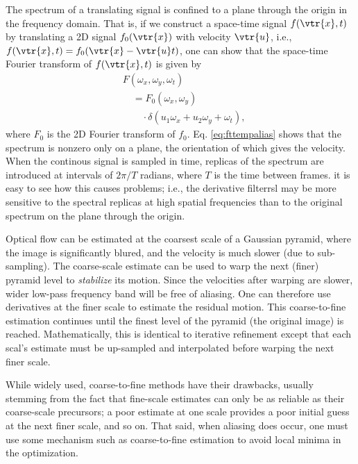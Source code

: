 \begin{compactdesc}
The spectrum of a translating signal is confined to a plane through the origin in the frequency domain. That is, if we construct a space-time signal $f(\vtr{x},t)$ by translating a 2D signal $f_0(\vtr{x})$ with  velocity $\vtr{u}$, i.e., $f(\vtr{x},t)=f_0(\vtr{x}-\vtr{u}t)$, one can show that the space-time Fourier transform of $f(\vtr{x},t)$ is given by
\begin{equation}
	\begin{split}
		&F(\omega_x,\omega_y,\omega_t)\\
		&\quad=F_0(\omega_x,\omega_y)\\
		&\qquad\cdot\delta\!\left( u_1\omega_x+u_2\omega_y+\omega_t \right),
	\end{split}
	\label{eq:fttempalias}
\end{equation}
where $F_0$ is the 2D Fourier transform of $f_0$. Eq. \ref{eq:fttempalias} shows that the spectrum is nonzero only on a plane, the orientation of which gives the velocity. When the continous signal is sampled in time, replicas of the spectrum are introduced at intervals of $2\pi/T$ radians, where $T$ is the time between frames. it is easy to see how this causes problems; i.e., the derivative filterrsl may be more sensitive to the spectral replicas at high spatial frequencies than to the original spectrum on the plane through the origin.

Optical flow can be estimated at the coarsest scale of a Gaussian pyramid, where the image is significantly blured, and the velocity is much slower (due to sub-sampling). The coarse-scale estimate can be used to warp the next (finer) pyramid level to \emph{stabilize} its motion. Since the velocities after warping are slower,  wider low-pass frequency band will be free of aliasing. One can therefore use derivatives at the finer scale to estimate the residual motion. This coarse-to-fine estimation continues until the finest level of the pyramid (the original image) is reached. Mathematically, this is identical to iterative refinement except that each scal's estimate must be up-sampled and interpolated before warping the next finer scale.

While widely used, coarse-to-fine methods have their drawbacks, usually stemming from the fact that fine-scale estimates can only be as reliable as their coarse-scale precursors; a poor estimate at one scale provides a poor initial guess at the next finer scale, and so on. That said, when aliasing does occur, one must use some mechanism such as coarse-to-fine estimation to avoid local minima in the optimization.


\end{compactdesc}

